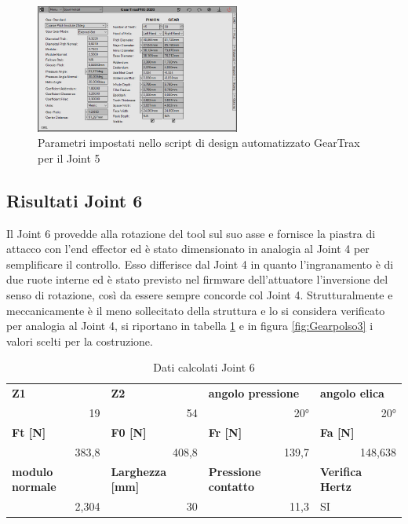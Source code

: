 \documentclass[%
corpo=11pt,
twoside,
 stile=classica,
oldstyle,
greek,%
]{toptesi}
\begin{document}
		\begin{figure} [H]
			\centering
			\includegraphics[width=0.6\textwidth]{Plots/POLSO2/gear_polso2.png}
			\caption{Parametri impostati nello script di design automatizzato GearTrax per il Joint 5}
			\label{fig:Gearpolso2}
		\end{figure} 
	
		
	
	
	\subsection{Risultati Joint 6}
		Il Joint 6 provedde alla rotazione del tool sul suo asse e fornisce la piastra di attacco con l'end effector ed è stato dimensionato in analogia al Joint 4 per semplificare il controllo. Esso differisce dal Joint 4 in quanto l'ingranamento è di due ruote interne ed è stato previsto nel firmware dell'attuatore l'inversione del senso di rotazione, così da essere sempre concorde col Joint 4. Strutturalmente e meccanicamente è il meno sollecitato della struttura e lo si considera verificato per analogia al Joint 4, si riportano in tabella \ref{tab:lewis3} e in figura \ref{fig:Gearpolso3} i valori scelti per la costruzione. 
	
		\begin{table}[H]
		\centering
		\caption{Dati calcolati Joint 6}
		\begin{tabular}{rrrl}
			\multicolumn{1}{l}{\textbf{Z1}} & \multicolumn{1}{l}{\textbf{Z2}} & \multicolumn{1}{l}{\textbf{angolo pressione}} & \textbf{angolo elica} \\
			19    & 54    & 20°    & \multicolumn{1}{r}{20°} \\
			\multicolumn{1}{l}{\textbf{Ft [N]}} & \multicolumn{1}{l}{\textbf{F0 [N]}} & \multicolumn{1}{l}{\textbf{Fr [N]}} & \textbf{Fa [N]} \\
			383,8 & 408,8 & 139,7 & \multicolumn{1}{r}{148,638} \\
			\multicolumn{1}{l}{\textbf{modulo normale}} & \multicolumn{1}{l}{\textbf{Larghezza [mm]}} & \multicolumn{1}{l}{\textbf{Pressione contatto}} & \textbf{Verifica Hertz} \\
			2,304 & 30    & 11,3  & SI \\
		\end{tabular}%
		\label{tab:lewis3}%
	\end{table}%
\end{document}
